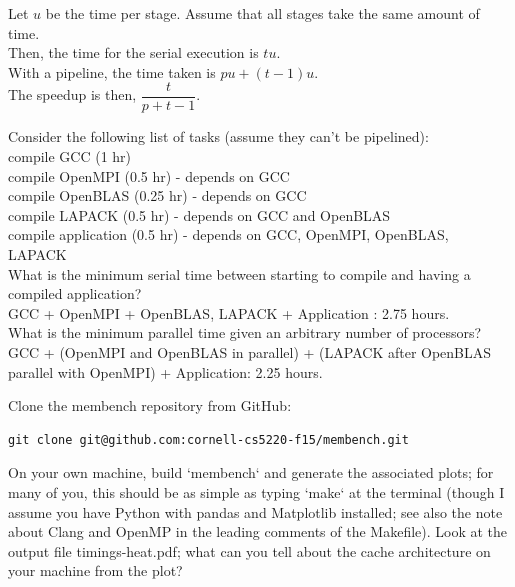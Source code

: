\documentclass{5220hw}
\begin{document}
\begin{exercises}
Let $u$ be the time per stage. Assume that all stages take the same amount of time. \\
Then, the time for the serial execution is $tu$. \\
With a pipeline, the time taken is $pu + (t-1)u$. \\
The speedup is then, $\dfrac{t}{p + t -1}$. \\

\item Consider the following list of tasks (assume they can't be pipelined): \\

compile GCC (1 hr) \\
compile OpenMPI (0.5 hr) - depends on GCC \\
compile OpenBLAS (0.25 hr) - depends on GCC \\
compile LAPACK (0.5 hr) - depends on GCC and OpenBLAS \\
compile application (0.5 hr) - depends on GCC, OpenMPI, OpenBLAS, LAPACK \\

What is the minimum serial time between starting to compile and having a compiled application? \\
GCC + OpenMPI + OpenBLAS, LAPACK + Application : 2.75 hours. \\ 
What is the minimum parallel time given an arbitrary number of processors? \\
GCC + (OpenMPI and OpenBLAS in parallel) + (LAPACK after OpenBLAS parallel with OpenMPI) + Application: 2.25 hours. \\

\item Clone the membench repository from GitHub:
\begin{lstlisting}
git clone git@github.com:cornell-cs5220-f15/membench.git
\end{lstlisting}

On your own machine, build `membench` and generate the associated plots; for many of you, this should be as simple as typing `make` at the terminal (though I assume you have Python with pandas and Matplotlib installed; see also the note about Clang and OpenMP in the leading comments of the Makefile).  Look at the output file timings-heat.pdf; what can you tell about the cache architecture on your machine from the plot? \\


\end{exercises}
\end{document}
